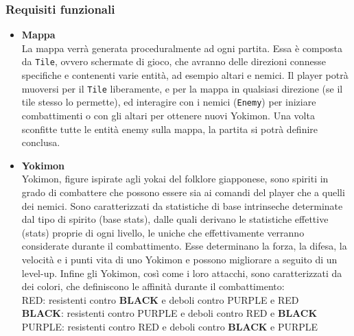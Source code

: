 \documentclass[a4paper,12pt]{report}
\begin{document}
\subsubsection{Requisiti funzionali}
\begin{itemize}
    \item \textbf{Mappa} \\
    La mappa verrà generata proceduralmente ad ogni partita. 
    Essa è composta da \texttt{Tile}, ovvero schermate di gioco, che avranno delle direzioni connesse specifiche e contenenti varie entità, ad esempio altari e nemici. 
    Il player potrà muoversi per il \texttt{Tile} liberamente, e per la mappa in qualsiasi direzione (se il tile stesso lo permette), ed interagire con i nemici (\texttt{Enemy}) per iniziare combattimenti o con gli altari per ottenere nuovi Yokimon. Una volta sconfitte tutte le entità enemy sulla mappa, la partita si potrà definire conclusa.
    \item \textbf{Yokimon} \\
    Yokimon, figure ispirate agli yokai del folklore giapponese, sono spiriti in grado di combattere che possono essere sia ai comandi del player che a quelli dei nemici.
    Sono caratterizzati da statistiche di base intrinseche determinate dal tipo di spirito (base stats), dalle quali derivano le statistiche effettive (stats) proprie di ogni livello, le uniche che effettivamente verranno considerate durante il combattimento. 
    Esse determinano la forza, la difesa, la velocità e i punti vita di uno Yokimon e possono migliorare a seguito di un level-up. Infine gli Yokimon, così come i loro attacchi, sono caratterizzati da dei colori, che definiscono le affinità durante il combattimento: \\
    \color{red}RED\color{black}: resistenti contro \textbf{BLACK} e deboli contro \color{violet}PURPLE\color{black}\hspace{1pt} e \color{red}RED\color{black} \\
    \textbf{BLACK}: resistenti contro \color{violet}PURPLE\color{black}\hspace{1pt} e deboli contro \color{red}RED\color{black}\hspace{1pt} e \textbf{BLACK} \\
    \color{violet}PURPLE\color{black}: resistenti contro \color{red}RED\color{black}\hspace{1pt} e deboli contro \textbf{BLACK} e \color{violet}PURPLE\color{black} \\

\end{itemize}
\end{document}
